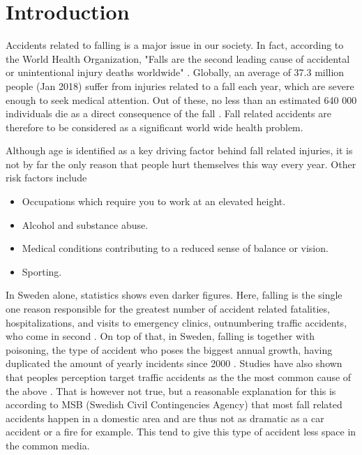\documentclass[12pt, a4paper, onecolumn]{article}
\begin{document}
	\tableofcontents
	\newpage
	
	\section{Introduction}
	
	Accidents related to falling is a major issue in our society. In fact, according to the World Health Organization, "Falls are the second leading cause of accidental or unintentional injury deaths worldwide" \cite{who}. Globally, an average of 37.3 million people (Jan 2018) suffer from injuries related to a fall each year, which are severe enough to seek medical attention. Out of these, no less than an estimated 640 000 individuals die as a direct consequence of the fall \cite{who}. Fall  related accidents are therefore to be considered as a significant world wide health problem. 
	
	Although age is identified as a key driving factor behind fall related injuries, it is not by far the only reason that people hurt themselves this way every year.  Other risk factors include 
	\begin{itemize}
		\item Occupations which require you to work at an elevated height.
		\item Alcohol and substance abuse.
		\item Medical conditions contributing to a reduced sense of balance or vision.
		\item Sporting.	
	\end{itemize}
	
	In Sweden alone, statistics shows even darker figures. Here, falling is the single one reason responsible for the greatest number of accident related fatalities, hospitalizations, and visits to emergency clinics, outnumbering traffic accidents, who come in second \cite[p~3,5]{msb_report}. On top of that, in Sweden, falling is together with poisoning, the type of accident who poses the biggest annual growth, having duplicated the amount of yearly incidents since 2000 \cite{soc_olyckor}. Studies have also shown that peoples perception target traffic accidents as the the most common cause of the above \cite[p~5]{msb_report}. That is however not true, but a reasonable explanation for this is according to MSB (Swedish Civil Contingencies Agency) that most fall related accidents happen in a domestic area and are thus not as dramatic as a car accident or a fire for example. This tend to give this type of accident less space in the common media. 
	
\end{document}
